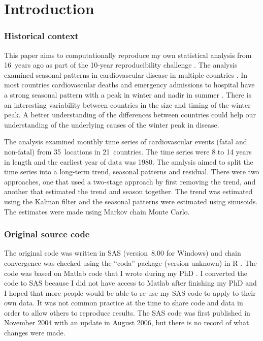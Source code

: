 \section{Introduction}

\subsubsection{Historical context}

This paper aims to computationally reproduce my own statistical analysis from 16~years ago as part of the 10-year reproducibility challenge \supercite{Hinsen2019}. The analysis examined seasonal patterns in cardiovascular disease in multiple countries \supercite{Barnett2004}. In most countries cardiovascular deaths and emergency admissions to hospital have a strong seasonal pattern with a peak in winter and nadir in summer \supercite{Stewart2017}. There is an interesting variability between-countries in the size and timing of the winter peak. A better understanding of the differences between countries could help our understanding of the underlying causes of the winter peak in disease.

The analysis examined monthly time series of cardiovascular events (fatal and non-fatal) from 35~locations in 21~countries. The time series were 8 to 14 years in length and the earliest year of data was 1980. The analysis aimed to split the time series into a long-term trend, seasonal patterns and residual. There were two approaches, one that used a two-stage approach by first removing the trend, and another that estimated the trend and season together. The trend was estimated using the Kalman filter and the seasonal patterns were estimated using sinusoids. The estimates were made using Markov chain Monte Carlo. 


\subsubsection{Original source code}

The original code was written in SAS (version~8.00 for Windows) and chain convergence was checked using the ``coda'' package (version unknown) in R \supercite{coda}. The code was based on Matlab code that I wrote during my PhD \supercite{Barnett2003}. I converted the code to SAS because I did not have access to Matlab after finishing my PhD and I hoped that more people would be able to re-use my SAS code to apply to their own data. It was not common practice at the time to share code and data in order to allow others to reproduce results. The SAS code was first published in November 2004 with an update in August 2006, but there is no record of what changes were made. 

